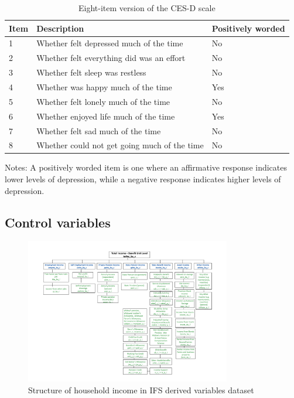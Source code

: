 \begin{table}[h!]
    \centering
    \caption{Eight-item version of the CES-D scale}
    \label{tab:cesd}
    \begin{threeparttable}
        \begin{tabular}{lll}
            \toprule
            Item & Description & Positively worded \\
            \midrule
            1 & Whether felt depressed much of the time & No \\
            2 & Whether felt everything did was an effort & No \\
            3 & Whether felt sleep was restless & No \\
            4 & Whether was happy much of the time & Yes \\
            5 & Whether felt lonely much of the time & No \\
            6 & Whether enjoyed life much of the time & Yes \\
            7 & Whether felt sad much of the time & No \\
            8 & Whether could not get going much of the time & No \\
            \bottomrule
        \end{tabular}
        \begin{tablenotes}
            \footnotesize
            \item Notes: A positively worded item is one where an affirmative response indicates lower levels of depression, while a negative response indicates higher levels of depression.
        \end{tablenotes}
    \end{threeparttable}
\end{table}

\subsection{Control variables}

\begin{figure}
    \centering
    \caption{Structure of household income in IFS derived variables dataset}
    \label{fig:household_income}
    \includegraphics[width=0.8\textwidth]{figures/household_income.jpg}
\end{figure}


